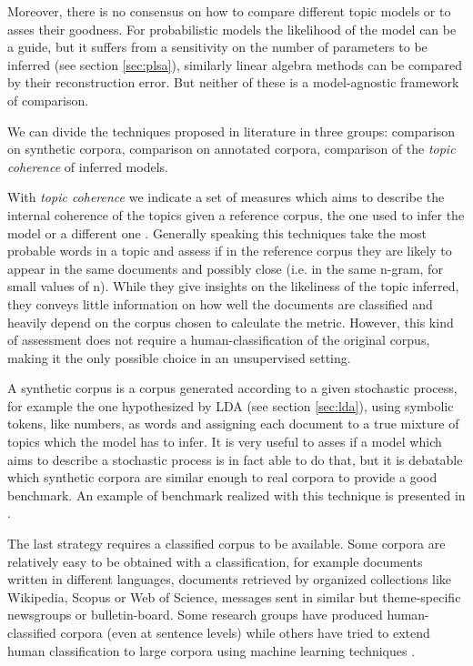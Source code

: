 \documentclass[11pt, a4paper, oneside, openright]{book}
\begin{document}
Moreover, there is no consensus on how to compare different topic models or to asses their goodness.
For probabilistic models the likelihood of the model can be a guide, but it suffers from a sensitivity on the number of parameters to be inferred (see section \ref{sec:plsa}), similarly linear algebra methods can be compared by their reconstruction error.
But neither of these is a model-agnostic framework of comparison.

We can divide the techniques proposed in literature in three groups: comparison on synthetic corpora, comparison on annotated corpora, comparison of the \textit{topic coherence} of inferred models.

With \textit{topic coherence} we indicate a set of measures which aims to describe the internal coherence of the topics given a reference corpus, the one used to infer the model or a different one \parencite{roder2015}. Generally speaking this techniques take the most probable words in a topic and assess if in the reference corpus they are likely to appear in the same documents and possibly close (i.e. in the same n-gram, for small values of n). While they give insights on the likeliness of the topic inferred, they conveys little information on how well the documents are classified and heavily depend on the corpus chosen to calculate the metric. However, this kind of assessment does not require a human-classification of the original corpus, making it the only possible choice in an unsupervised setting.

A synthetic corpus is a corpus generated according to a given stochastic process, for example the one hypothesized by LDA (see section \ref{sec:lda}), using symbolic tokens, like numbers, as words and assigning each document to a true mixture of topics which the model has to infer. It is very useful to asses if a model which aims to describe a stochastic process is in fact able to do that, but it is debatable which synthetic corpora are similar enough to real corpora to provide a good benchmark. An example of benchmark realized with this technique is presented in \textcite{shiNewEvaluationFramework2019}.

The last strategy requires a classified corpus to be available. Some corpora are relatively easy to be obtained with a classification, for example documents written in different languages, documents retrieved by organized collections like Wikipedia, Scopus or Web of Science, messages sent in similar but theme-specific newsgroups or bulletin-board.
Some research groups have produced human-classified corpora (even at sentence levels) \parencite[e.g.][]{merzManifestoCorpusNew2016} while others have tried to extend human classification to large corpora using machine learning techniques \parencite[e.g.][]{angrist2017}.
\end{document}
